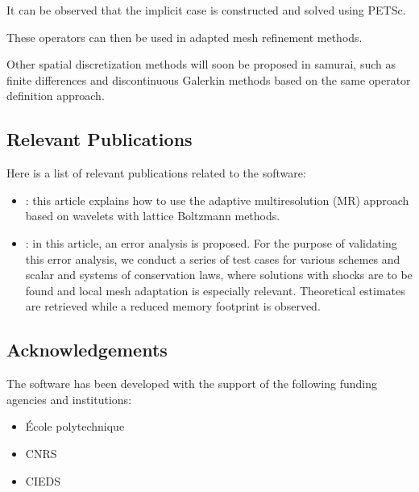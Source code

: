 It can be observed that the implicit case is constructed and solved using PETSc.

These operators can then be used in adapted mesh refinement methods.

Other spatial discretization methods will soon be proposed in samurai, such as finite differences and discontinuous Galerkin methods based on the same operator definition approach.

\subsection{Relevant Publications}
\label{sec:Samurai:publications}

Here is a list of relevant publications related to the software:

\begin{itemize}
    \item \cite{bellotti_multidimensional_2022}: this article explains how to use the adaptive multiresolution (MR) approach based on wavelets with lattice Boltzmann methods.
    \item \cite{bellotti_multiresolution-based_2022}: in this article, an error analysis is proposed. For the purpose of validating this error analysis, we conduct a series of test cases for various schemes and scalar and systems of conservation laws, where solutions with shocks are to be found and local mesh adaptation is especially relevant. Theoretical estimates are retrieved while a reduced memory footprint is observed.
\end{itemize}

\subsection{Acknowledgements}
\label{sec::Samurai:acknowledgements}

The software has been developed with the support of the following funding agencies and institutions:
\begin{itemize}
    \item \'Ecole polytechnique
    \item CNRS
    \item CIEDS
 \end{itemize}
